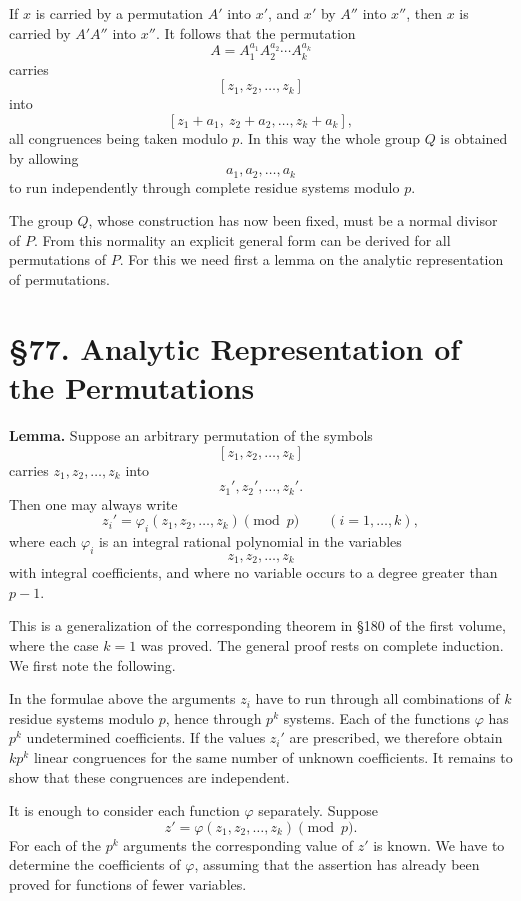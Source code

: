 \documentclass[11pt,a4paper]{book}
\newcommand{\webersection}[2]{\clearpage\section*{\S #1. #2}}
\begin{document}
If \(x\) is carried by a permutation \(A'\) into \(x'\), and \(x'\) by \(A''\) into \(x''\), then \(x\) is carried by \(A'A''\) into \(x''\).  It follows that the permutation
\[
 A=A_1^{a_1}A_2^{a_2}\cdots A_k^{a_k}
\]
carries
\[
 [z_1,z_2,\ldots,z_k]
\]
into
\[
 [z_1+a_1,\ z_2+a_2,\ldots,z_k+a_k],
\]
all congruences being taken modulo \(p\).  In this way the whole group \(Q\) is obtained by allowing
\[
 a_1,a_2,\ldots,a_k
\]
to run independently through complete residue systems modulo \(p\).

The group \(Q\), whose construction has now been fixed, must be a normal divisor of \(P\).  From this normality an explicit general form can be derived for all permutations of \(P\).  For this we need first a lemma on the analytic representation of permutations.

\webersection{77}{Analytic Representation of the Permutations}

\textbf{Lemma.}  Suppose an arbitrary permutation of the symbols
\[
 [z_1,z_2,\ldots,z_k]
\]
carries \(z_1,z_2,\ldots,z_k\) into
\[
 z_1',z_2',\ldots,z_k'.
\]
Then one may always write
\[
 z_i'=\varphi_i(z_1,z_2,\ldots,z_k)\pmod p
 \qquad (i=1,\ldots,k),
\]
where each \(\varphi_i\) is an integral rational polynomial in the variables
\[
 z_1,z_2,\ldots,z_k
\]
with integral coefficients, and where no variable occurs to a degree greater than \(p-1\).

This is a generalization of the corresponding theorem in \S 180 of the first volume, where the case \(k=1\) was proved.  The general proof rests on complete induction.  We first note the following.

In the formulae above the arguments \(z_i\) have to run through all combinations of \(k\) residue systems modulo \(p\), hence through \(p^k\) systems.  Each of the functions \(\varphi\) has \(p^k\) undetermined coefficients.  If the values \(z_i'\) are prescribed, we therefore obtain \(kp^k\) linear congruences for the same number of unknown coefficients.  It remains to show that these congruences are independent.

It is enough to consider each function \(\varphi\) separately.  Suppose
\[
 z'=\varphi(z_1,z_2,\ldots,z_k)\pmod p .
\]
For each of the \(p^k\) arguments the corresponding value of \(z'\) is known.  We have to determine the coefficients of \(\varphi\), assuming that the assertion has already been proved for functions of fewer variables.
\end{document}
